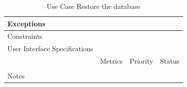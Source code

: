 \begin{table}[H]
\begin{tabularx}{\linewidth}{|l|X|X|X|}
            \hline Exceptions                    & \multicolumn{3}{l|}{}                                                                                 \\

            \hline Constraints                   & \multicolumn{3}{l|}{}                                                                                 \\

            \hline User Interface Specifications & \multicolumn{3}{l|}{}                                                                                 \\

            \hline \multirow{2}{*}{}             & Metrics                                                                           & Priority & Status \\
            \cline{2-4}                          &                                                                                   &          &        \\
            \hline Notes                         & \multicolumn{3}{l|}{}                                                                                 \\
            \hline
      \end{tabularx}
      \caption{Use Case Restore the database}
      \label{tab:use_case_restore_the_database}
\end{table}

